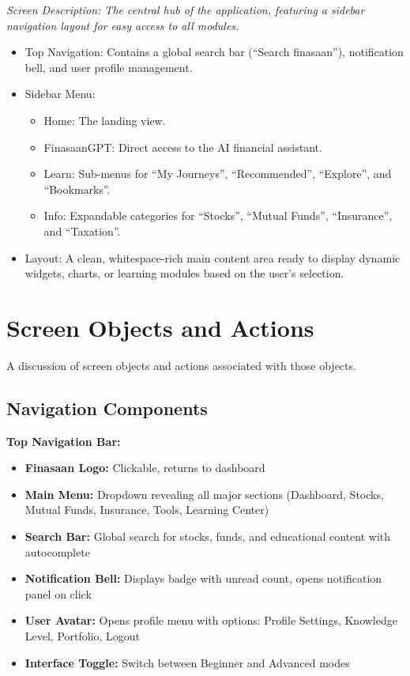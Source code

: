\documentclass[12pt,a4paper]{report}
\begin{document}
\textit{Screen Description: The central hub of the application, featuring a sidebar navigation layout for easy access to all modules.}
\begin{itemize}
    \item Top Navigation: Contains a global search bar (``Search finasaan''), notification bell, and user profile management.
    \item Sidebar Menu:
    \begin{itemize}
        \item Home: The landing view.
        \item FinasaanGPT: Direct access to the AI financial assistant.
        \item Learn: Sub-menus for ``My Journeys'', ``Recommended'', ``Explore'', and ``Bookmarks''.
        \item Info: Expandable categories for ``Stocks'', ``Mutual Funds'', ``Insurance'', and ``Taxation''.
    \end{itemize}
    \item Layout: A clean, whitespace-rich main content area ready to display dynamic widgets, charts, or learning modules based on the user's selection.
\end{itemize}
\section{Screen Objects and Actions}

A discussion of screen objects and actions associated with those objects.

\subsection{Navigation Components}

\textbf{Top Navigation Bar:}
\begin{itemize}
    \item \textbf{Finasaan Logo:} Clickable, returns to dashboard
    \item \textbf{Main Menu:} Dropdown revealing all major sections (Dashboard, Stocks, Mutual Funds, Insurance, Tools, Learning Center)
    \item \textbf{Search Bar:} Global search for stocks, funds, and educational content with autocomplete
    \item \textbf{Notification Bell:} Displays badge with unread count, opens notification panel on click
    \item \textbf{User Avatar:} Opens profile menu with options: Profile Settings, Knowledge Level, Portfolio, Logout
    \item \textbf{Interface Toggle:} Switch between Beginner and Advanced modes
\end{itemize}
\end{document}
